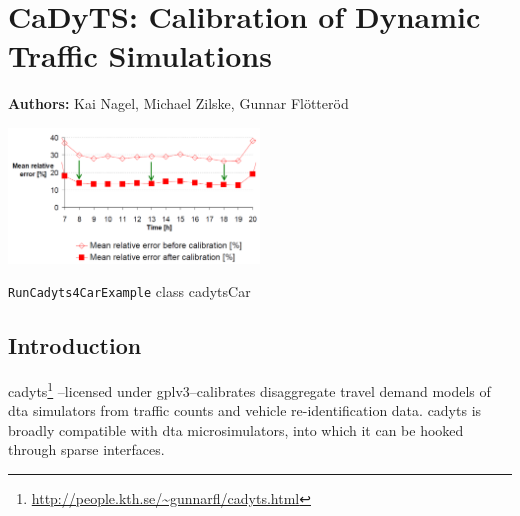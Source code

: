 \chapter{CaDyTS: Calibration of Dynamic Traffic Simulations}
\label{ch:cadyts}

\hfill \textbf{Authors:} Kai Nagel, Michael Zilske, Gunnar Fl\"otter\"od

\begin{center} \includegraphics[width=0.5\textwidth, angle=0]{extending/figures/cadyts/cadyts} \end{center}


{\lstinline{RunCadyts4CarExample} class}
{cadytsCar}
{\citet[][]{cadyts-manual, floetteroed-2010e, FloetteroedChenEtAl2011BehavioralCalibAndAnaNETS, Floetteroed2008PhD, Moyo2013PhD}}



\section{Introduction}

\gls{cadyts}\footnote{\url{http://people.kth.se/~gunnarfl/cadyts.html}}
--licensed under \gls{gplv3}--calibrates disaggregate travel demand models 
of \gls{dta} simulators from traffic counts and vehicle re-identification data. 
\gls{cadyts} is broadly compatible with \gls{dta} microsimulators,
into which it can be hooked through sparse interfaces.

